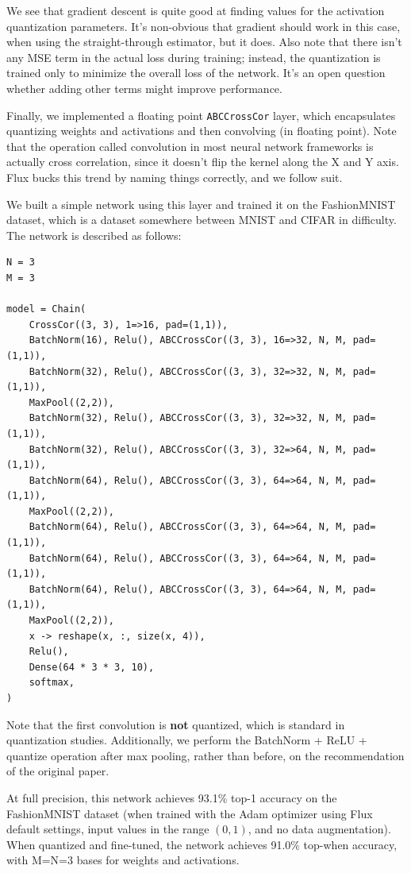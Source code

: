 \documentclass[12pt]{article}
\begin{document}
We see that gradient descent is quite good at finding values for the activation quantization parameters. It's non-obvious that gradient should work in this case, when using the straight-through estimator, but it does.
Also note that there isn't any MSE term in the actual loss during training; instead, the quantization is trained only to minimize the overall loss of the network. It's an open question whether adding other terms might improve performance.

Finally, we implemented a floating point \texttt{ABCCrossCor} layer, which encapsulates quantizing weights and activations and then convolving (in floating point). Note that the operation called convolution in most neural network frameworks is actually cross correlation, since it doesn't flip the kernel along the X and Y axis. Flux bucks this trend by naming things correctly, and we follow suit.

We built a simple network using this layer and trained it on the FashionMNIST \citep{FashionMNIST} dataset, which is a dataset somewhere between MNIST and CIFAR in difficulty. The network is described as follows:

\begin{verbatim}
N = 3
M = 3

model = Chain(
    CrossCor((3, 3), 1=>16, pad=(1,1)),
    BatchNorm(16), Relu(), ABCCrossCor((3, 3), 16=>32, N, M, pad=(1,1)),
    BatchNorm(32), Relu(), ABCCrossCor((3, 3), 32=>32, N, M, pad=(1,1)),
    MaxPool((2,2)),
    BatchNorm(32), Relu(), ABCCrossCor((3, 3), 32=>32, N, M, pad=(1,1)),
    BatchNorm(32), Relu(), ABCCrossCor((3, 3), 32=>64, N, M, pad=(1,1)),
    BatchNorm(64), Relu(), ABCCrossCor((3, 3), 64=>64, N, M, pad=(1,1)),
    MaxPool((2,2)),
    BatchNorm(64), Relu(), ABCCrossCor((3, 3), 64=>64, N, M, pad=(1,1)),
    BatchNorm(64), Relu(), ABCCrossCor((3, 3), 64=>64, N, M, pad=(1,1)),
    BatchNorm(64), Relu(), ABCCrossCor((3, 3), 64=>64, N, M, pad=(1,1)),
    MaxPool((2,2)),
    x -> reshape(x, :, size(x, 4)),
    Relu(),
    Dense(64 * 3 * 3, 10),
    softmax,
)
\end{verbatim}

Note that the first convolution is \textbf{not} quantized, which is standard in quantization studies. Additionally, we perform the BatchNorm + ReLU + quantize operation after max pooling, rather than before, on the recommendation of the original paper.

At full precision, this network achieves 93.1\% top-1 accuracy on the FashionMNIST dataset (when trained with the Adam optimizer using Flux default settings, input values in the range \((0, 1)\), and no data augmentation). When quantized and fine-tuned, the network achieves 91.0\% top-when accuracy, with M=N=3 bases for weights and activations.
\end{document}
